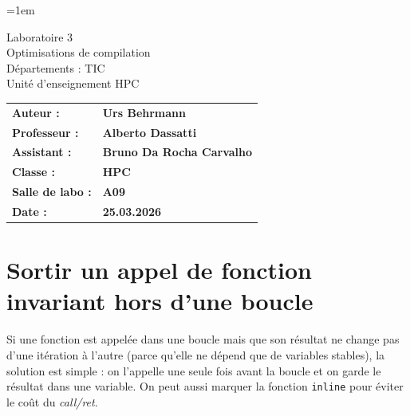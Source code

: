 \documentclass[a4paper,12pt]{article}
\author{Urs Behrmann}
\begin{document}
\emergencystretch=1em %

\thispagestyle{firstpage}


\vspace*{2cm}
\begin{center}
    \Huge Laboratoire 3 \\
    \vspace{0.2cm}
    \Large Optimisations de compilation\\
    \vspace{1cm}
    \small Départements : TIC\\
    Unité d'enseignement HPC\\
\end{center}

\vspace{9cm}

\renewcommand{\arraystretch}{1.5} %

\begin{flushleft} %
    \begin{tabular}{@{}l l@{}}
        \textbf{Auteur :}       & \textbf{Urs Behrmann} \\
        \textbf{Professeur :}    & \textbf{Alberto Dassatti} \\
        \textbf{Assistant :}     & \textbf{Bruno Da Rocha Carvalho} \\
        \textbf{Classe :}        & \textbf{HPC} \\
        \textbf{Salle de labo :} & \textbf{A09} \\
        \textbf{Date :}          & \textbf{25.03.2026} \\
    \end{tabular}
\end{flushleft}

\newpage

\pagestyle{otherpages}

\tableofcontents

\newpage

\section{Sortir un appel de fonction invariant hors d'une boucle}

Si une fonction est appelée dans une boucle mais que son résultat ne change pas d'une itération à l'autre (parce qu'elle ne dépend que de variables stables), la solution est simple : on l'appelle une seule fois avant la boucle et on garde le résultat dans une variable. On peut aussi marquer la fonction \texttt{inline} pour éviter le coût du \emph{call/ret}.
\end{document}
